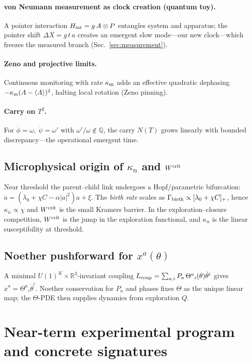\documentclass[11pt]{article}
\begin{document}
\paragraph{von Neumann measurement as clock creation (quantum toy).}
A pointer interaction $H_{\rm int}=g\,A\otimes P$ entangles system and apparatus; the pointer shift $\Delta X=g\,t\, a$ creates an emergent slow mode—our new clock—which freezes the measured branch (Sec.~\ref{sec:measurement}).

\paragraph{Zeno and projective limits.}
Continuous monitoring with rate $\kappa_{\rm m}$ adds an effective quadratic dephasing $-\kappa_{\rm m}(A-\langle A\rangle)^2$, halting local rotation (Zeno pinning).
\paragraph{Carry on $T^2$.}
For $\dot\phi=\omega,\ \dot\psi=\omega'$ with $\omega'/\omega\notin\mathbb Q$, the carry $N(T)$ grows linearly with bounded discrepancy—the operational emergent time.

\subsection{Microphysical origin of $\kappa_n$ and $W^{\rm crit}$}\label{subsec:kappa-Wcrit-origin}
Near threshold the parent--child link undergoes a Hopf/parametric bifurcation: $\dot a = (\lambda_0 + \chi C - \alpha |a|^2)a + \xi$.
The \emph{birth rate} scales as $\Gamma_{\rm birth}\propto[\lambda_0+\chi C]_+$, hence $\kappa_n\propto \chi$ and $W^{\rm crit}$ is the small Kramers barrier.
In the exploration--closure competition, $W^{\rm crit}$ is the jump in the exploration functional, and $\kappa_n$ is the linear susceptibility at threshold.

\subsection{Noether pushforward for $x^a(\theta)$}\label{subsec:noether-push}
A minimal $U(1)^K\times\mathbb R^3$-invariant coupling $L_{\rm coup}=\sum_{a,i}P_a\,\Theta^a{}_i(\theta)\dot\theta^i$ gives $\dot x^a=\Theta^a{}_i\dot\theta^i$.
Noether conservation for $P_a$ and phases fixes $\Theta$ as the unique linear map; the $\Theta$-PDE then supplies dynamics from exploration $Q$.

\section{Near-term experimental program and concrete signatures}\label{sec:exp-program}
\end{document}
